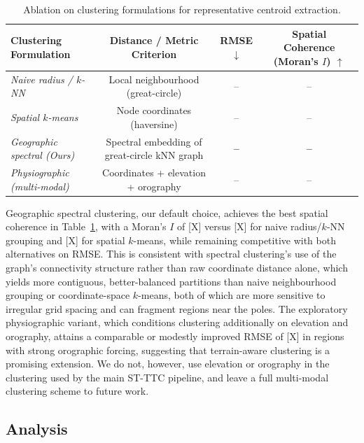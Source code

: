 \documentclass[preprint,12pt]{elsarticle}
\begin{document}
\begin{table}[H]
\centering
\small
\caption{Ablation on clustering formulations for representative centroid extraction.}
\label{tab:ablation_clustering}
\begin{tabular}{lccc}
\toprule
Clustering Formulation & Distance / Metric Criterion & RMSE $\downarrow$ & Spatial Coherence (Moran's $I$) $\uparrow$ \\
\midrule
\textit{Naive radius / $k$-NN} & Local neighbourhood (great-circle) & -- & -- \\
\textit{Spatial $k$-means}   & Node coordinates (haversine) & -- & -- \\
\textit{Geographic spectral (Ours)}  & Spectral embedding of great-circle kNN graph & \textbf{--} & \textbf{--} \\
\textit{Physiographic (multi-modal)} & Coordinates + elevation + orography & -- & -- \\
\bottomrule
\end{tabular}
\end{table}

Geographic spectral clustering, our default choice, achieves the best spatial coherence in Table~\ref{tab:ablation_clustering}, with a Moran's $I$ of [X] versus [X] for naive radius/$k$-NN grouping and [X] for spatial $k$-means, while remaining competitive with both alternatives on RMSE. This is consistent with spectral clustering's use of the graph's connectivity structure rather than raw coordinate distance alone, which yields more contiguous, better-balanced partitions than naive neighbourhood grouping or coordinate-space $k$-means, both of which are more sensitive to irregular grid spacing and can fragment regions near the poles. The exploratory physiographic variant, which conditions clustering additionally on elevation and orography, attains a comparable or modestly improved RMSE of [X] in regions with strong orographic forcing, suggesting that terrain-aware clustering is a promising extension. We do not, however, use elevation or orography in the clustering used by the main ST-TTC pipeline, and leave a full multi-modal clustering scheme to future work.

\subsection{Analysis}
\label{sec:analysis}
\end{document}
